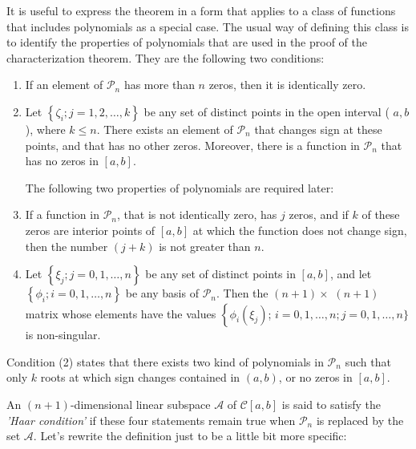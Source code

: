\documentclass[11pt]{article}
\begin{document}
It is useful to express the theorem in a form that applies to a class of functions that includes polynomials as a special case. The usual way of defining this class is to identify the properties of polynomials that are used in the proof of the characterization theorem. They are the following two conditions:
\begin{enumerate}[label=(\arabic*)]
\item If an element of $\mathscr{P}_{n}$ has more than $n$ zeros, then it is identically zero.

\item Let $\left\{\zeta_{i} ; j=1,2, \ldots, k\right\}$ be any set of distinct points in the open interval ( $a, b$ ), where $k \leqslant n$. There exists an element of $\mathscr{P}_{n}$ that changes sign at these points, and that has no other zeros. Moreover, there is a function in $\mathscr{P}_{n}$ that has no zeros in $[a, b]$.

\hspace{-2em} The following two properties of polynomials are required later:

\item If a function in $\mathscr{P}_{n}$, that is not identically zero, has $j$ zeros, and if $k$ of these zeros are interior points of $[a, b]$ at which the function does not change sign, then the number $(j+k)$ is not greater than $n$.

\item Let $\left\{\xi_{j} ; j=0,1, \ldots, n\right\}$ be any set of distinct points in $[a, b]$, and let $\left\{\phi_{i} ; i=0,1, \ldots, n\right\}$ be any basis of $\mathscr{P}_{n}$. Then the $(n+1) \times$ $(n+1)$ matrix whose elements have the values $\left\{\phi_{i}\left(\xi_{j}\right)\right.$; $i=0,1, \ldots, n ; j=0,1, \ldots, n\}$ is non-singular.
\end{enumerate}

\begin{remark}
Condition (2) states that there exists two kind of polynomials in $\mathscr{P}_n$ such that only $k$ roots at which sign changes contained in $(a,b)$, or no zeros in $[a,b]$.
\end{remark}

An $(n+1)$-dimensional linear subspace $\mathscr{A}$ of $\mathscr{C}[a, b]$ is said to satisfy the {\it 'Haar condition'} if these four statements remain true when $\mathscr{P}_{n}$ is replaced by the set $\mathscr{A}$. Let's rewrite the definition just to be a little bit more specific:
\end{document}
